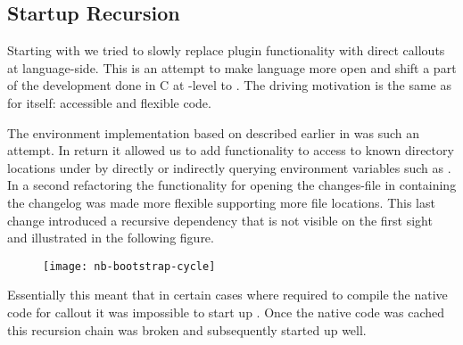 \subsection{Startup Recursion}

Starting with  we tried to slowly replace \VM plugin functionality with direct \FFI callouts at language-side.
This is an attempt to make language more open and shift a part of the development done in C at \VM-level to \PH.
The driving motivation is the same as for \NB itself: accessible and flexible code.

The \OS environment implementation based on \NB described earlier in  was such an attempt.
In return it allowed us to add functionality to access to known directory locations under \Linux by directly or indirectly querying environment variables such as .
In a second refactoring the functionality for opening the changes-file in \PH containing the changelog was made more flexible supporting more file locations.
This last change introduced a recursive dependency that is not visible on the first sight and illustrated in the following figure.
%
\begin{figure}[h]
	\centering
	\texttt{[image: nb-bootstrap-cycle]}
\end{figure}
%
Essentially this meant that in certain cases where \NB required to compile the native code for callout it was impossible to start up \PH.
Once the native code was cached this recursion chain was broken and subsequently \PH started up well.

